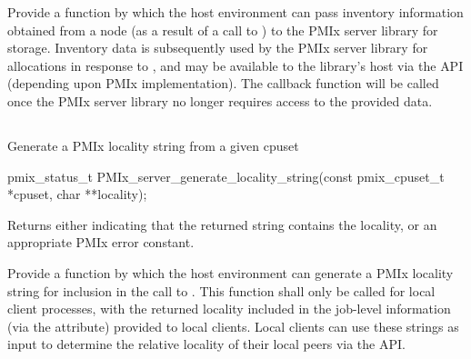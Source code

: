 \descr

Provide a function by which the host environment can pass inventory information obtained from a node (as a result of a call to ) to the \ac{PMIx} server library for storage. Inventory data is subsequently used by the \ac{PMIx} server library for allocations in response to , and may be available to the library's host via the  \ac{API} (depending upon \ac{PMIx} implementation). The  callback function will be called once the \ac{PMIx} server library no longer requires access to the provided data.

\subsection{}

\summary

Generate a \ac{PMIx} locality string from a given cpuset

\format

\cspecificstart
\begin{codepar}
pmix_status_t
PMIx_server_generate_locality_string(const pmix_cpuset_t *cpuset,
                                     char **locality);
\end{codepar}
\cspecificend

\begin{arglist}
\end{arglist}

Returns either  indicating that the returned string contains the locality, or an appropriate \ac{PMIx} error constant.


\descr

Provide a function by which the host environment can generate a \ac{PMIx} locality string for inclusion in the call to . This function shall only be called for local client processes, with the returned locality included in the job-level information (via the  attribute) provided to local clients. Local clients can use these strings as input to determine the relative locality of their local peers via the  \ac{API}.

